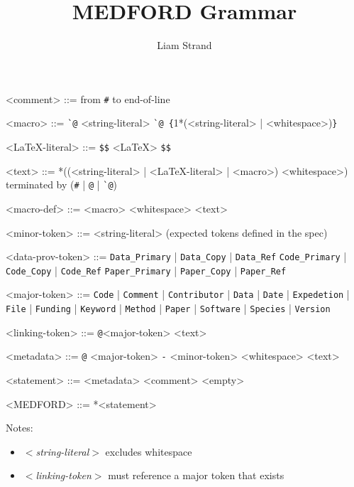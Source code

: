 \documentclass{article}
\begin{document}
\title{MEDFORD Grammar}
\date{}
\author{Liam Strand}
\maketitle

\setlength{\grammarindent}{10em} %

\newcommand{\ttt}[1]{\texttt{#1}}

\begin{grammar}

<comment> ::= from \ttt{\#} to end-of-line

<macro> ::= \ttt{\`{}@} <string-literal>
\alt \ttt{\`{}@ \{}1*(<string-literal> | <whitespace>)\ttt{\}}

<\LaTeX-literal> ::= \ttt{\$\$} <\LaTeX> \ttt{\$\$}

<text> ::= *((<string-literal> | <\LaTeX-literal> | <macro>) <whitespace>) 
terminated by (\ttt{\#} | \ttt{@} | \ttt{\`{}@})

<macro-def> ::= <macro> <whitespace> <text>

<minor-token> ::= <string-literal> (expected tokens defined in the spec)

<data-prov-token> ::= \ttt{Data\_Primary} | \ttt{Data\_Copy} | \ttt{Data\_Ref}
\alt \ttt{Code\_Primary} | \ttt{Code\_Copy} | \ttt{Code\_Ref}
\alt \ttt{Paper\_Primary} | \ttt{Paper\_Copy} | \ttt{Paper\_Ref}

<major-token> ::= \ttt{Code} | \ttt{Comment} | \ttt{Contributor} | \ttt{Data} | \ttt{Date} | \ttt{Expedetion} | \ttt{File} | \ttt{Funding} | \ttt{Keyword} | \ttt{Method} | \ttt{Paper} | \ttt{Software} | \ttt{Species} | \ttt{Version}

<linking-token> ::= \ttt{@}<major-token> <text>

<metadata> ::= \ttt{@} <major-token> \ttt{-} <minor-token> <whitespace> <text>

<statement> ::= <metadata>
\alt <comment>
\alt <empty>

<MEDFORD> ::= *<statement>

\end{grammar}

\bigskip

Notes: 
\begin{itemize}
    \item \textit{\(<\)string-literal\(>\)} excludes whitespace
    \item \textit{\(<\)linking-token\(>\)} must reference a major token that exists
\end{itemize}
\end{document}
